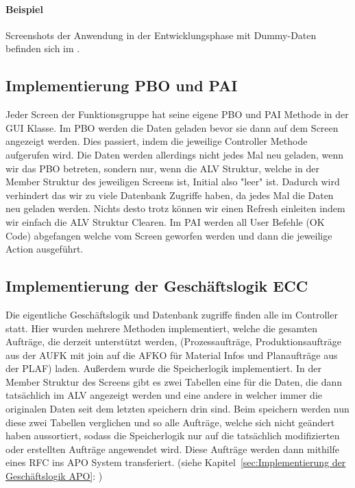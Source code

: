 \paragraph{Beispiel}
Screenshots der Anwendung in der Entwicklungsphase mit Dummy-Daten befinden sich im .

\subsection{Implementierung PBO und PAI}
\label{sec:Implementierung PBO und PAI}
Jeder Screen der Funktionsgruppe hat seine eigene \ac{PBO} und \ac{PAI} Methode in der GUI Klasse. Im PBO werden die Daten geladen bevor sie dann auf dem Screen angezeigt werden. Dies passiert, indem die jeweilige Controller Methode aufgerufen wird. Die Daten werden allerdings nicht jedes Mal neu geladen, wenn wir das \ac{PBO} betreten, sondern nur, wenn die ALV Struktur, welche in der Member Struktur des jeweiligen Screens ist, Initial also "leer" ist. Dadurch wird verhindert das wir zu viele Datenbank Zugriffe haben, da jedes Mal die Daten neu geladen werden. Nichts desto trotz können wir einen Refresh einleiten indem wir einfach die \ac{ALV} Struktur Clearen. Im \ac{PAI} werden all User Befehle (OK Code) abgefangen welche vom Screen geworfen werden und dann die jeweilige Action ausgeführt. 

\subsection{Implementierung der Geschäftslogik ECC}
\label{sec:Implementierung der Geschäftslogik ECC}
Die eigentliche Geschäftslogik und Datenbank zugriffe finden alle im Controller statt. Hier wurden mehrere Methoden implementiert, welche die gesamten Aufträge, die derzeit unterstützt werden, (Prozessaufträge, Produktionsaufträge aus der AUFK mit join auf die AFKO für Material Infos und Planaufträge aus der PLAF) laden. Außerdem wurde die Speicherlogik implementiert. In der Member Struktur des Screens gibt es zwei Tabellen eine für die Daten, die dann tatsächlich im \ac{ALV} angezeigt werden und eine andere in welcher immer die originalen Daten seit dem letzten speichern drin sind. Beim speichern werden nun diese zwei Tabellen verglichen und so alle Aufträge, welche sich nicht geändert haben aussortiert, sodass die Speicherlogik nur auf die tatsächlich modifizierten oder erstellten Aufträge angewendet wird. Diese Aufträge werden dann mithilfe eines RFC ins \ac{APO} System transferiert. (siehe Kapitel~\ref{sec:Implementierung der Geschäftslogik APO}: )     

